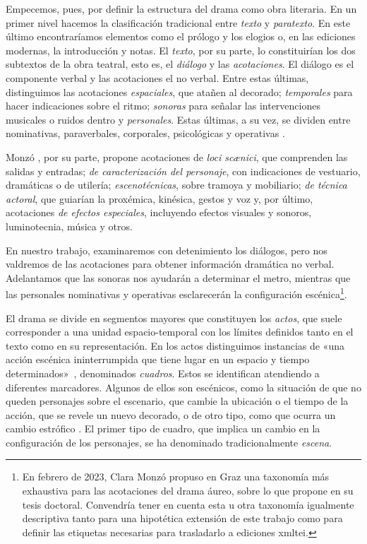 Empecemos, pues, por definir la estructura del drama como obra literaria. En un primer nivel hacemos la clasificación tradicional entre \textit{texto} y \textit{paratexto}. En este último encontraríamos elementos como el prólogo y los elogios o, en las ediciones modernas, la introducción y notas. El \textit{texto}, por su parte, lo constituirían los dos subtextos de la obra teatral, esto es, el \textit{diálogo} y las \textit{acotaciones}. El diálogo es el componente verbal y las acotaciones el no verbal. Entre estas últimas, distinguimos las acotaciones \textit{espaciales}, que atañen al decorado; \textit{temporales} para hacer indicaciones sobre el ritmo; \textit{sonoras} para señalar las intervenciones musicales o ruidos dentro y \textit{personales}. Estas últimas, a su vez, se dividen entre nominativas, paraverbales, corporales, psicológicas y operativas \parencite[75-79]{garcia2020}.

Monzó \parencite*[75-76]{monzo2019}, por su parte, propone acotaciones de \textit{loci scænici}, que comprenden las salidas y entradas; \textit{de caracterización del personaje}, con indicaciones de vestuario, dramáticas o de utilería; \textit{escenotécnicas}, sobre tramoya y mobiliario; \textit{de técnica actoral}, que guiarían la proxémica, kinésica, gestos y voz y, por último, acotaciones \textit{de efectos especiales}, incluyendo efectos visuales y sonoros, luminotecnia, música y otros.

 En nuestro trabajo, examinaremos con detenimiento los diálogos, pero nos valdremos de las acotaciones para obtener información dramática no verbal. Adelantamos que las sonoras nos ayudarán a determinar el metro, mientras que las personales nominativas y operativas esclarecerán la configuración escénica\footnote{En febrero de 2023, Clara Monzó propuso en Graz una taxonomía más exhaustiva para las acotaciones del drama áureo, sobre lo que propone en su tesis doctoral. Convendría tener en cuenta esta u otra taxonomía igualmente descriptiva tanto para una hipotética extensión de este trabajo como para definir las etiquetas necesarias para trasladarlo a ediciones \ac{xmltei}.}.

El drama se divide en segmentos mayores que constituyen los \textit{actos}, que suele corresponder a una unidad espacio-temporal con los límites definidos tanto en el texto como en su representación. En los actos distinguimos instancias de «una acción escénica ininterrumpida que tiene lugar en un espacio y tiempo determinados»~\parencite[91]{ruano2007}, denominados \textit{cuadros}. Estos se identifican atendiendo a diferentes marcadores. Algunos de ellos son escénicos, como la situación de que no queden personajes sobre el escenario, que cambie la ubicación o el tiempo de la acción, que se revele un nuevo decorado, o de otro tipo, como que ocurra un cambio estrófico \parencite[291-292]{ruano1994}. El primer tipo de cuadro, que implica un cambio en la configuración de los personajes, se ha denominado tradicionalmente \textit{escena}.

